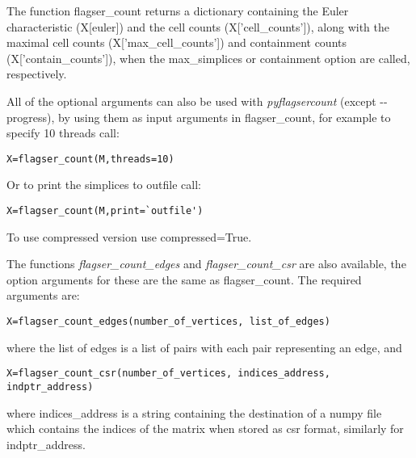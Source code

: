 \documentclass{amsart}
\theoremstyle{definition}
\begin{document}
The function flagser\_count returns a dictionary containing the Euler characteristic (X[euler]) and the cell counts (X['cell\_counts']), along with the maximal cell counts (X['max\_cell\_counts']) and containment counts (X['contain\_counts']), when the max\_simplices or containment option are called, respectively.

All of the optional arguments can also be used with \textit{pyflagsercount} (except -{}-progress), by using them as input arguments in flagser\_count, for example to specify 10 threads call:
\begin{verbatim}X=flagser_count(M,threads=10)\end{verbatim}
Or to print the simplices to outfile call:
\begin{verbatim}X=flagser_count(M,print=`outfile')\end{verbatim}

To use compressed version use compressed=True.

The functions \textit{flagser\_count\_edges} and \textit{flagser\_count\_csr} are also available, the option arguments for these are the same as flagser\_count. The required arguments are:
\begin{verbatim}X=flagser_count_edges(number_of_vertices, list_of_edges)\end{verbatim}
where the list of edges is a list of pairs with each pair representing an edge, and
\begin{verbatim}X=flagser_count_csr(number_of_vertices, indices_address, indptr_address)\end{verbatim}
where indices\_address is a string containing the destination of a numpy file which contains the indices of the matrix when stored as csr format, similarly for indptr\_address.
\end{document}

